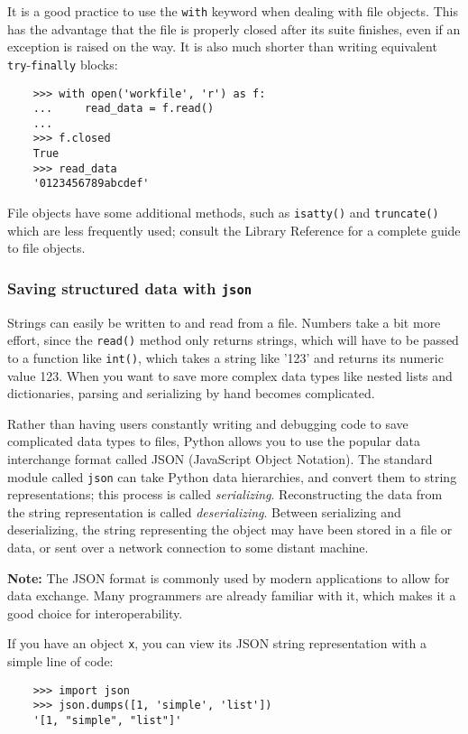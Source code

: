 \documentclass[UTF8]{article}
\begin{document}
It is a good practice to use the \texttt{with} keyword when dealing with file objects.
This has the advantage that the file is properly closed after its suite finishes, even if an
exception is raised on the way. It is also much shorter than writing equivalent
\texttt{try}-\texttt{finally} blocks:
\begin{verbatim}
    >>> with open('workfile', 'r') as f:
    ...     read_data = f.read()
    ...
    >>> f.closed
    True
    >>> read_data
    '0123456789abcdef'
\end{verbatim}

File objects have some additional methods, such as \texttt{isatty()} and \texttt{truncate()} which
are less frequently used; consult the Library Reference for a complete guide to file objects.

\subsubsection{Saving structured data with \texttt{json}}
Strings can easily be written to and read from a file. Numbers take a bit more effort, since the
\texttt{read()} method only returns strings, which will have to be passed to a function like
\texttt{int()}, which takes a string like '123' and returns its numeric value 123. When you want to
save more complex data types like nested lists and dictionaries, parsing and serializing by hand
becomes complicated.

Rather than having users constantly writing and debugging code to save complicated data types to
files, Python allows you to use the popular data interchange format called JSON (JavaScript Object
Notation). The standard module called \texttt{json} can take Python data hierarchies, and convert
them to string representations; this process is called \emph{serializing}. Reconstructing the data
from the string representation is called \emph{deserializing}. Between serializing and
deserializing, the string representing the object may have been stored in a file or data, or sent
over a network connection to some distant machine.

\textbf{Note:} The JSON format is commonly used by modern applications to allow for data exchange.
Many programmers are already familiar with it, which makes it a good choice for interoperability.

If you have an object \texttt{x}, you can view its JSON string representation with a simple line of
code:
\begin{verbatim}
    >>> import json
    >>> json.dumps([1, 'simple', 'list'])
    '[1, "simple", "list"]'
\end{verbatim}
\end{document}
